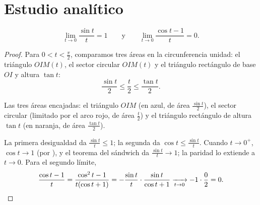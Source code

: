 \section{Estudio analítico}

\begin{lemma}\label{lem:g12:trigo:sinxx}
\[
\lim_{t \to 0} \frac{\sin t}{t} = 1
\qquad\text{y}\qquad
\lim_{t \to 0} \frac{\cos t - 1}{t} = 0 .
\]
\end{lemma}

\begin{proof}
Para $0 < t < \frac{\pi}{2}$, comparamos tres áreas en la circunferencia
unidad: el triángulo $OIM(t)$, el sector circular $OIM(t)$ y el triángulo
rectángulo de base $OI$ y altura $\tan t$:
\[
\frac{\sin t}{2} \leq \frac{t}{2} \leq \frac{\tan t}{2}.
\]

\begin{omfigure}

{\small Las tres áreas encajadas: el triángulo $OIM$ (en azul, de área
$\frac{\sin t}{2}$), el sector circular (limitado por el arco rojo, de área
$\frac{t}{2}$) y el triángulo rectángulo de altura $\tan t$ (en naranja, de
área $\frac{\tan t}{2}$).}
\end{omfigure}

La primera desigualdad da $\frac{\sin t}{t} \leq 1$; la segunda da
$\cos t \leq \frac{\sin t}{t}$. Cuando $t \to 0^+$, $\cos t \to 1$ (por
), y el teorema del sándwich da $\frac{\sin t}{t} \to 1$; la
paridad lo extiende a $t \to 0$. Para el segundo límite,
\[
\frac{\cos t - 1}{t} = \frac{\cos^2 t - 1}{t(\cos t + 1)}
= -\frac{\sin t}{t}\cdot\frac{\sin t}{\cos t + 1}
\xrightarrow[t\to0]{} -1 \cdot \frac{0}{2} = 0. \qedhere
\]
\end{proof}

